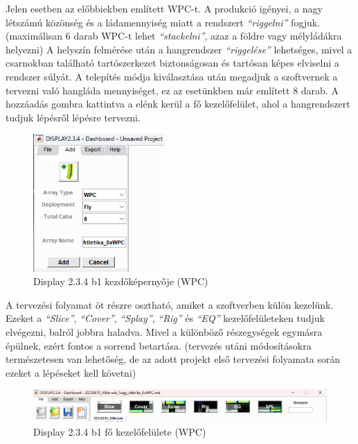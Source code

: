 Jelen esetben az előbbiekben említett WPC-t. A produkció igényei, a nagy létszámú közönség és a ládamennyiség miatt a rendszert
\textit{``riggelni''} fogjuk. (maximálisan 6 darab WPC-t lehet \textit{``stackelni''}, azaz a földre vagy mélyládákra helyezni)
A helyszín felmérése után a hangrendszer \textit{``riggelése''} lehetséges, mivel a csarnokban található tartószerkezet biztonságosan
és tartósan képes elviselni a rendszer súlyát.
A telepítés módja kiválasztása után megadjuk a szoftvernek a tervezni való hangláda mennyiséget, ez az esetünkben már említett 8 darab.
A hozzáadás gombra kattintva a elénk kerül a fő kezelőfelület, ahol a hangrendszert tudjuk lépésről lépésre tervezni.
\begin{figure}[H]
	\centering
	\includegraphics[width=50mm, keepaspectratio]{figures/display_wpc_0.png}
	\caption{Display 2.3.4 b1 kezdőképernyője (WPC)}\label{fig:display_wpc_0}
\end{figure}
A tervezési folyamat öt részre osztható, amiket a szoftverben külön kezelünk.
Ezeket a \textit{``Slice''}, \textit{``Cover''}, \textit{``Splay''}, \textit{``Rig''} és \textit{``EQ''} kezelőfelületeken tudjuk elvégezni,
balról jobbra haladva. Mivel a különböző részegységek egymásra épülnek, ezért fontos a sorrend betartása.
(tervezés utáni módosításokra természetesen van lehetőség, de az adott projekt első tervezési folyamata során ezeket a lépéseket kell követni)
\begin{figure}[H]
	\centering
	\includegraphics[width=\textwidth, keepaspectratio]{figures/display_wpc_0_1.png}
	\caption{Display 2.3.4 b1 fő kezelőfelülete (WPC)}\label{fig:display_wpc_0_1}
\end{figure}
